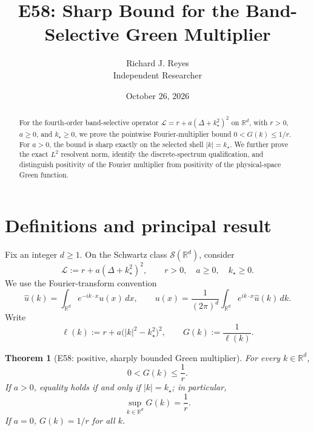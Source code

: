 \documentclass[11pt]{article}
\title{E58: Sharp Bound for the Band-Selective Green Multiplier}
\author{Richard J. Reyes\\Independent Researcher}
\date{October 26, 2026}
\newtheorem{theorem}{Theorem}
\newcommand{\R}{\mathbb R}
\begin{document}
\maketitle

\begin{abstract}
For the fourth-order band-selective operator
$\mathcal L=r+a(\Delta+k_\star^2)^2$ on $\R^d$, with $r>0$, $a\geq0$,
and $k_\star\geq0$, we prove the pointwise Fourier-multiplier bound
$0<G(k)\leq 1/r$. For $a>0$, the bound is sharp exactly on the selected
shell $|k|=k_\star$. We further prove the exact $L^2$ resolvent norm,
identify the discrete-spectrum qualification, and distinguish positivity
of the Fourier multiplier from positivity of the physical-space Green
function.
\end{abstract}

\section{Definitions and principal result}

Fix an integer $d\geq1$. On the Schwartz class $\mathcal S(\R^d)$,
consider
\begin{equation}\label{eq:L}
  \mathcal L := r+a(\Delta+k_\star^2)^2,
  \qquad r>0,\quad a\geq0,\quad k_\star\geq0.
\end{equation}
We use the Fourier-transform convention
\begin{equation}\label{eq:fourier}
  \widehat u(k)=\int_{\R^d}e^{-ik\cdot x}u(x)\,dx,
  \qquad
  u(x)=\frac{1}{(2\pi)^d}\int_{\R^d}e^{ik\cdot x}\widehat u(k)\,dk.
\end{equation}
Write
\begin{equation}\label{eq:symbol}
  \ell(k):=r+a\bigl(|k|^2-k_\star^2\bigr)^2,
  \qquad
  G(k):=\frac{1}{\ell(k)}.
\end{equation}

\begin{theorem}[E58: positive, sharply bounded Green multiplier]
\label{thm:E58}
For every $k\in\R^d$,
\begin{equation}\label{eq:mainbound}
  \boxed{\quad 0<G(k)\leq\frac1r.\quad}
\end{equation}
If $a>0$, equality holds if and only if $|k|=k_\star$; in particular,
\begin{equation}\label{eq:sup}
  \sup_{k\in\R^d}G(k)=\frac1r.
\end{equation}
If $a=0$, $G(k)=1/r$ for all $k$.
\end{theorem}
\end{document}
